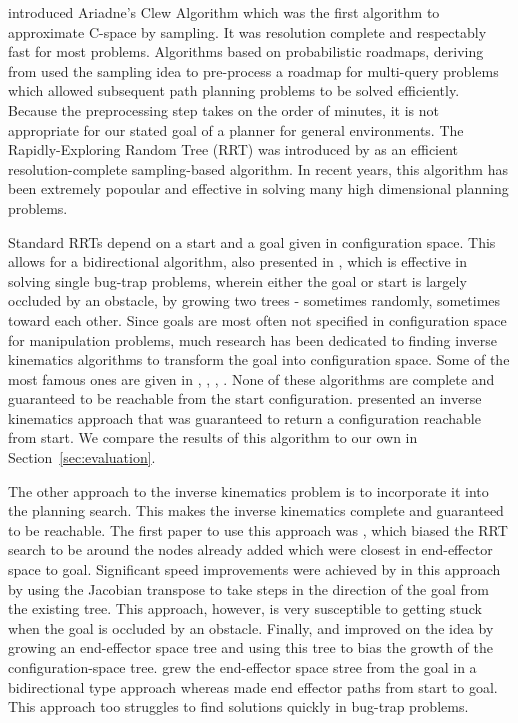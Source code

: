 \documentclass[conference]{IEEEtran}
\begin{document}
\cite{bessiere93} introduced Ariadne's Clew Algorithm which was the first algorithm to approximate C-space by sampling. It was resolution
complete and respectably fast for most problems. Algorithms based on probabilistic roadmaps, deriving from \cite{amato96} used the sampling
idea to pre-process a roadmap for multi-query problems which allowed subsequent path planning problems to be solved efficiently. Because the
preprocessing step takes on the order of minutes, it is not appropriate for our stated goal of a planner for general environments. The
Rapidly-Exploring Random Tree (RRT) was introduced by \cite{lavalle00} as an efficient resolution-complete sampling-based algorithm. In
recent years, this algorithm has been extremely popoular and effective in solving many high dimensional planning problems.

Standard RRTs depend on a start and a goal given in configuration space. This allows for a bidirectional algorithm, also presented in
\cite{lavalle00}, which is effective in solving single bug-trap problems, wherein either the goal or start is largely occluded by an
obstacle, by growing two trees - sometimes randomly, sometimes toward each other. Since goals are most often not specified in configuration
space for manipulation problems, much research has been dedicated to finding inverse kinematics algorithms to transform the goal into
configuration space. Some of the most famous ones are given in \cite{goldenberg85}, \cite{guez88}, \cite{chang87}, \cite{parker89}. None of
these algorithms are complete and guaranteed to be reachable from the start configuration. \cite{ahuactzin99} presented an inverse
kinematics approach that was guaranteed to return a configuration reachable from start. We compare the results of this algorithm to our own
in Section~\ref{sec:evaluation}. 

The other approach to the inverse kinematics problem is to incorporate it into the planning search. This makes the inverse kinematics
complete and guaranteed to be reachable. The first paper to use this approach was \cite{bertram06}, which biased the RRT search to be around
the nodes already added which were closest in end-effector space to goal. Significant speed improvements were achieved by \cite{vande07} in this
approach by using the Jacobian transpose to take steps in the direction of the goal from the existing tree. This approach, however, is very
susceptible to getting stuck when the goal is occluded by an obstacle. Finally, \cite{diankov08} and \cite{yao05}  improved on the idea by
growing an end-effector space tree and using this tree to bias the growth of the configuration-space tree. \cite{diankov08} grew
the end-effector space stree from the goal in a bidirectional type approach whereas \cite{yao05} made end effector paths from start to goal. This
approach too struggles to find solutions quickly in bug-trap problems.
 
\end{document}
